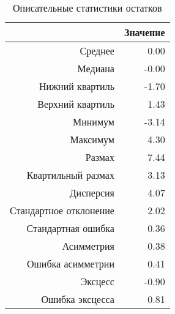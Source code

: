 \begin{table}[ht]
\centering
\caption{Описательные статистики остатков} 
\label{table:residuals_dstats}
\begin{tabular}{rr}
  \hline
 & Значение \\ 
  \hline
Среднее & 0.00 \\ 
  Медиана & -0.00 \\ 
  Нижний квартиль & -1.70 \\ 
  Верхний квартиль & 1.43 \\ 
  Минимум & -3.14 \\ 
  Максимум & 4.30 \\ 
  Размах & 7.44 \\ 
  Квартильный размах & 3.13 \\ 
  Дисперсия & 4.07 \\ 
  Стандартное отклонение & 2.02 \\ 
  Стандартная ошибка & 0.36 \\ 
  Асимметрия & 0.38 \\ 
  Ошибка асимметрии & 0.41 \\ 
  Эксцесс & -0.90 \\ 
  Ошибка эксцесса & 0.81 \\ 
   \hline
\end{tabular}
\end{table}
